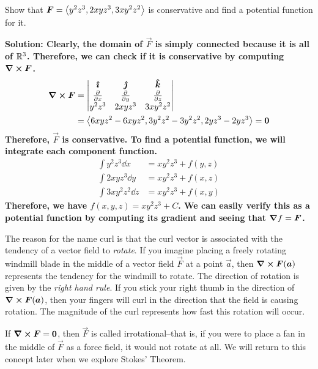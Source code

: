 \begin{example}
    Show that $\boldsymbol{F} = \left\langle y^2z^3, 2xyz^3, 3xy^2z^2\right\rangle$ is conservative and find a potential function for it. \par
    \bf{Solution:} Clearly, the domain of $\vec F$ is simply connected because it is all of $\mathbb{R}^3$. Therefore, we can check if it is conservative by computing $\curl \boldsymbol{F}$.
    \begin{align*}
        \curl \boldsymbol{F} &= \begin{vmatrix} \boldsymbol{\hat{\imath}} & \boldsymbol{\hat{\jmath}} & \boldsymbol{\hat{k}} \\ \pdv{}{x} & \pdv{}{y} & \pdv{}{z} \\ y^2z^3 & 2xyz^3 & 3xy^2z^2 \end{vmatrix}\\&= \left\langle 6xyz^2 - 6xyz^2, 3y^2z^2-3y^2z^2, 2yz^3-2yz^3\right\rangle = \boldsymbol{0}
    \end{align*} 
    Therefore, $\vec F$ is conservative. To find a potential function, we will integrate each component function.
    \begin{align*}
        \int y^2z^3 \dd x &= xy^2z^3 + f(y,z) \\
        \int 2xyz^3 \dd y &= xy^2z^3 + f(x, z) \\
        \int 3xy^2z^2 \dd z &= xy^2z^3 + f(x, y)
    \end{align*}
    Therefore, we have $f(x,y,z) = xy^2z^3+C$. We can easily verify this as a potential function by computing its gradient and seeing that $\boldsymbol\nabla f = \boldsymbol{F}$.
\end{example}
The reason for the name curl is that the curl vector is associated with the tendency of a vector field to \textit{rotate}. If you imagine placing a freely rotating windmill blade in the middle of a vector field $\vec F$ at a point $\vec a$, then $\curl \boldsymbol{F} (\boldsymbol{a})$ represents the tendency for the windmill to rotate. The direction of rotation is given by the \textit{right hand rule}. If you stick your right thumb in the direction of $\curl \boldsymbol{F}(\boldsymbol{a})$, then your fingers will curl in the direction that the field is causing rotation. The magnitude of the curl represents how fast this rotation will occur. \par
If $\curl\boldsymbol{F}=\boldsymbol{0}$, then $\vec F$ is called irrotational--that is, if you were to place a fan in the middle of $\vec F$ as a force field, it would not rotate at all. We will return to this concept later when we explore Stokes' Theorem.
